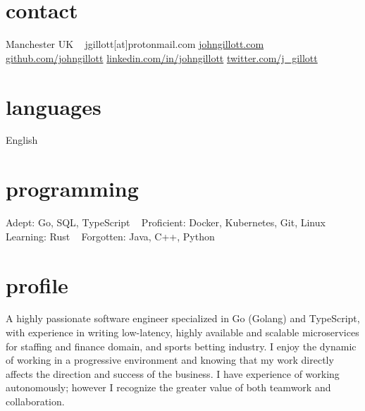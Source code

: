 \documentclass[]{friggeri-cv-a4} %
\begin{document}

\begin{aside} %
\section{contact}
Manchester
UK
~
jgillott[at]protonmail.com
\href{https://www.johngillott.com/}{johngillott.com}
\href{https://github.com/johngillott}{github.com/johngillott}
\href{https://www.linkedin.com/in/johngillott/}{linkedin.com/in/johngillott}
\href{https://twitter.com/j\_gillott}{twitter.com/j\_gillott}
\section{languages}
English
\section{programming}
Adept:
Go, SQL, TypeScript
~
Proficient:
Docker, Kubernetes, Git, Linux
~
Learning:
Rust
~
Forgotten:
Java, C++, Python
\end{aside}

\section{profile}

A highly passionate software engineer specialized in Go (Golang) and TypeScript, with experience in writing low-latency, highly available and scalable microservices
for staffing and finance domain, and sports betting industry. I enjoy the dynamic of working in a progressive environment and knowing that my work
directly affects the direction and success of the business. I have experience of working autonomously; however I recognize the greater value of both teamwork and collaboration.
\end{document}
